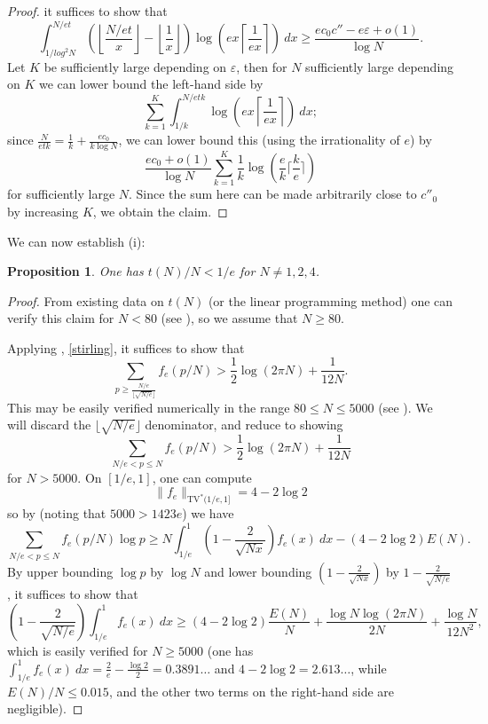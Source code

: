 \documentclass[12pt,a4paper,reqno]{amsart}
\numberwithin{equation}{section}
\theoremstyle{plain}
\newtheorem{proposition}[theorem]{Proposition}
\theoremstyle{definition}
\newcommand\eps{\varepsilon}
\begin{document}
\begin{proof}
it suffices to show that
$$
\int_{1/log^2 N}^{N/et}
(\left\lfloor \frac{N/et}{x} \right\rfloor - \left\lfloor \frac{1}{x} \right\rfloor) \log\left(ex \left\lceil \frac{1}{ex} \right\rceil \right)\ dx \geq \frac{ec_0 c'' - e\eps + o(1)}{\log N}.$$
Let $K$ be sufficiently large depending on $\eps$, then for $N$ sufficiently large depending on $K$ we can lower bound the left-hand side by
$$ \sum_{k=1}^K \int_{1/k}^{N/etk} \log\left(ex \left\lceil \frac{1}{ex} \right\rceil \right)\ dx;$$
since $\frac{N}{etk} = \frac{1}{k} + \frac{ec_0}{k \log N}$, we can lower bound this (using the irrationality of $e$) by
$$ \frac{ec_0+o(1)}{\log N} \sum_{k=1}^K \frac{1}{k} \log\left(\frac{e}{k} \lceil \frac{k}{e} \rceil\right)$$
for sufficiently large $N$.  Since the sum here can be made arbitrarily close to $c''_0$ by increasing $K$, we obtain the claim.
\end{proof}
    
We can now establish (i): 

\begin{proposition}\label{tne} One has $t(N)/N < 1/e$ for $N \neq 1,2,4$.
\end{proposition}

\begin{proof}  From existing data on $t(N)$ (or the linear programming method) one can verify this claim for $N < 80$ (see ), so we assume that $N\geq 80$.
  
Applying , \eqref{stirling}, it suffices to show that
\begin{equation}\label{base-test-ineq}
   \sum_{p \geq \frac{N/e}{\lfloor\sqrt{N/e}\rfloor}} f_{e}(p/N) > \frac{1}{2} \log(2\pi N) + \frac{1}{12N}.
\end{equation}
This may be easily verified numerically in the range $80 \leq N \leq 5000$ (see ).
We will discard the $\lfloor\sqrt{N/e}\rfloor$ denominator, and reduce to showing
\begin{equation}\label{test-ineq}
  \sum_{N/e < p \leq N} f_{e}(p/N) > \frac{1}{2} \log(2\pi N) + \frac{1}{12N}
\end{equation}
for $N > 5000$.  On $[1/e,1]$, one can compute
$$ \|f_e\|_{\mathrm{TV}^*(1/e,1]}
= 4 - 2 \log 2$$
so by  (noting that $5000 > 1423e$) we have
$$ \sum_{N/e < p \leq N} f_{e}(p/N) \log p
\geq N \int_{1/e}^1 \left(1-\frac{2}{\sqrt{Nx}}\right) f_e(x)\ dx - (4 - 2 \log 2) E(N).
$$
By upper bounding $\log p$ by $\log N$ and lower bounding $\left(1-\frac{2}{\sqrt{Nx}}\right)$ by $1 - \frac{2}{\sqrt{N/e}}$, it suffices to show that
$$ \left(1 - \frac{2}{\sqrt{N/e}}\right) \int_{1/e}^1 f_e(x)\ dx \geq
(4 - 2 \log 2) \frac{E(N)}{N}
+ \frac{\log N \log(2\pi N)}{2N} + \frac{\log N}{12N^2},$$
which is easily verified for $N \geq 5000$ (one has $\int_{1/e}^1 f_e(x)\ dx = \frac{2}{e}-\frac{\log 2}{2}=0.3891\dots$ and $4-2\log 2 = 2.613\dots$, while $E(N)/N \leq 0.015$, and the other two terms on the right-hand side are negligible).
\end{proof}
\end{document}
